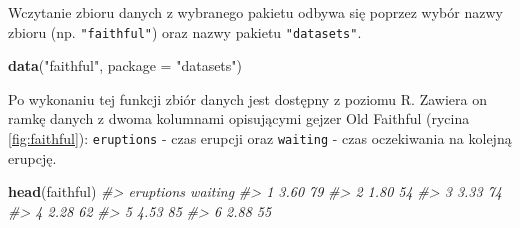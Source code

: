 \documentclass[paper=6in:9in,pagesize=pdftex,headinclude=on,footinclude=on,10pt]{scrbook}
\newenvironment{Shaded}{\begin{snugshade}}{\end{snugshade}}
\newcommand{\CommentTok}[1]{\textcolor[rgb]{0.56,0.35,0.01}{\textit{#1}}}
\newcommand{\DataTypeTok}[1]{\textcolor[rgb]{0.13,0.29,0.53}{#1}}
\newcommand{\KeywordTok}[1]{\textcolor[rgb]{0.13,0.29,0.53}{\textbf{#1}}}
\newcommand{\NormalTok}[1]{#1}
\newcommand{\StringTok}[1]{\textcolor[rgb]{0.31,0.60,0.02}{#1}}
\begin{document}
Wczytanie zbioru danych z wybranego pakietu odbywa się poprzez wybór nazwy zbioru (np. \texttt{"faithful"}) oraz nazwy pakietu \texttt{"datasets"}.

\begin{Shaded}
\begin{Highlighting}[]
\KeywordTok{data}\NormalTok{(}\StringTok{"faithful"}\NormalTok{, }\DataTypeTok{package =} \StringTok{"datasets"}\NormalTok{)}
\end{Highlighting}
\end{Shaded}

Po wykonaniu tej funkcji zbiór danych jest dostępny z poziomu R.
Zawiera on ramkę danych z dwoma kolumnami opisującymi gejzer Old Faithful (rycina \ref{fig:faithful}): \texttt{eruptions} - czas erupcji oraz \texttt{waiting} - czas oczekiwania na kolejną erupcję.

\begin{Shaded}
\begin{Highlighting}[]
\KeywordTok{head}\NormalTok{(faithful)}
\CommentTok{#>   eruptions waiting}
\CommentTok{#> 1      3.60      79}
\CommentTok{#> 2      1.80      54}
\CommentTok{#> 3      3.33      74}
\CommentTok{#> 4      2.28      62}
\CommentTok{#> 5      4.53      85}
\CommentTok{#> 6      2.88      55}
\end{Highlighting}
\end{Shaded}
\end{document}
